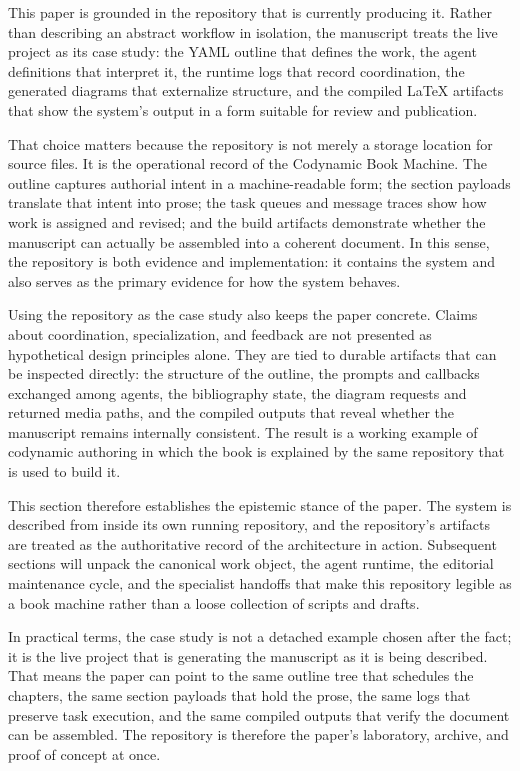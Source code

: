 This paper is grounded in the repository that is currently producing it. Rather than describing an abstract workflow in isolation, the manuscript treats the live project as its case study: the YAML outline that defines the work, the agent definitions that interpret it, the runtime logs that record coordination, the generated diagrams that externalize structure, and the compiled \LaTeX{} artifacts that show the system's output in a form suitable for review and publication.

That choice matters because the repository is not merely a storage location for source files. It is the operational record of the Codynamic Book Machine. The outline captures authorial intent in a machine-readable form; the section payloads translate that intent into prose; the task queues and message traces show how work is assigned and revised; and the build artifacts demonstrate whether the manuscript can actually be assembled into a coherent document. In this sense, the repository is both evidence and implementation: it contains the system and also serves as the primary evidence for how the system behaves.

Using the repository as the case study also keeps the paper concrete. Claims about coordination, specialization, and feedback are not presented as hypothetical design principles alone. They are tied to durable artifacts that can be inspected directly: the structure of the outline, the prompts and callbacks exchanged among agents, the bibliography state, the diagram requests and returned media paths, and the compiled outputs that reveal whether the manuscript remains internally consistent. The result is a working example of codynamic authoring in which the book is explained by the same repository that is used to build it.

This section therefore establishes the epistemic stance of the paper. The system is described from inside its own running repository, and the repository's artifacts are treated as the authoritative record of the architecture in action. Subsequent sections will unpack the canonical work object, the agent runtime, the editorial maintenance cycle, and the specialist handoffs that make this repository legible as a book machine rather than a loose collection of scripts and drafts.

In practical terms, the case study is not a detached example chosen after the fact; it is the live project that is generating the manuscript as it is being described. That means the paper can point to the same outline tree that schedules the chapters, the same section payloads that hold the prose, the same logs that preserve task execution, and the same compiled outputs that verify the document can be assembled. The repository is therefore the paper's laboratory, archive, and proof of concept at once.

